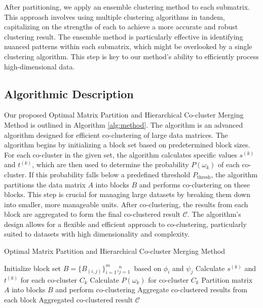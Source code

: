 After partitioning, we apply an ensemble clustering method to each submatrix. This approach involves using multiple clustering algorithms in tandem, capitalizing on the strengths of each to achieve a more accurate and robust clustering result. The ensemble method is particularly effective in identifying nuanced patterns within each submatrix, which might be overlooked by a single clustering algorithm. This step is key to our method's ability to efficiently process high-dimensional data.

\subsection{Algorithmic Description}
Our proposed  Optimal Matrix Partition and Hierarchical Co-cluster Merging Method is outlined in Algorithm \ref{alg:method}. The algorithm
is an advanced algorithm designed for efficient co-clustering of large data matrices. The algorithm begins by initializing a block set based on predetermined block sizes. For each co-cluster in the given set, the algorithm calculates specific values $s^{(k)}$ and $t^{(k)}$, which are then used to determine the probability $P(\omega_k)$ of each co-cluster. If this probability falls below a predefined threshold $P_{\text{thresh}}$, the algorithm partitions the data matrix $A$ into blocks $B$ and performs co-clustering on these blocks. This step is crucial for managing large datasets by breaking them down into smaller, more manageable units. After co-clustering, the results from each block are aggregated to form the final co-clustered result $\mathcal{C}$. The algorithm's design allows for a flexible and efficient approach to co-clustering, particularly suited to datasets with high dimensionality and complexity.

\begin{algorithm}[!t]
    \caption{Optimal Matrix Partition and Hierarchical Co-cluster Merging Method}\label{alg:method}
    \begin{algorithmic}[1]
        \STATE Initialize block set $B = \{B_{(i,j)}\}_{i=1}^m,_{j=1}^n$ based on $\phi_i$ and $\psi_j$
        \STATE Calculate $s^{(k)}$ and $t^{(k)}$ for each co-cluster $C_k$
        \STATE Calculate $P(\omega_k)$ for co-cluster $C_k$
        \STATE Partition matrix $A$ into blocks $B$ and perform co-clustering
        \STATE Aggregate co-clustered results from each block
        \ENDIF
        \ENDFOR
        \RETURN Aggregated co-clustered result $\mathcal{C}$
    \end{algorithmic}
\end{algorithm}
